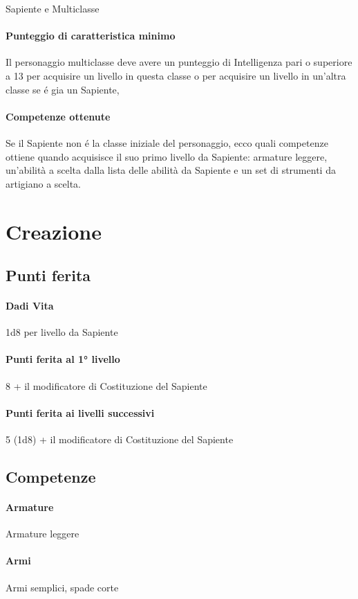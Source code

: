 \begin{DndSidebar}{Sapiente e Multiclasse}
\paragraph{Punteggio di caratteristica minimo} Il personaggio multiclasse deve avere un punteggio di Intelligenza pari o superiore a 13 per acquisire un livello in questa classe o per acquisire un livello in un'altra classe se é gia un Sapiente,
\paragraph{Competenze ottenute} Se il Sapiente non é la classe iniziale del personaggio, ecco quali competenze ottiene quando acquisisce il suo primo livello da Sapiente: armature leggere, un'abilità a scelta dalla lista delle abilità da Sapiente e un set di strumenti da artigiano a scelta.
\end{DndSidebar}

\section{Creazione}

\subsection{Punti ferita}
\paragraph{Dadi Vita} 1d8 per livello da Sapiente
\paragraph{Punti ferita al 1° livello} 8 + il modificatore di Costituzione del Sapiente
\paragraph{Punti ferita ai livelli successivi} 5 (1d8) + il modificatore di Costituzione del Sapiente

\subsection{Competenze}
\paragraph{Armature} Armature leggere
\paragraph{Armi} Armi semplici, spade corte
